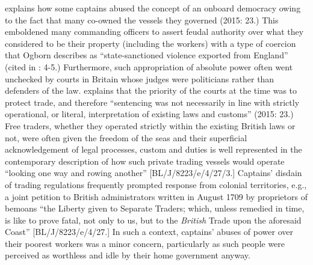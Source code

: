 \citeauthor{Fusaro2015} explains how some captains abused the concept of an onboard democracy owing to the fact that many co-owned the vessels they governed (2015: 23.) This emboldened many commanding officers to assert feudal authority over what they considered to be their property (including the workers) with a type of coercion that Ogborn describes as “state-sanctioned violence exported from England” (cited in \citealt{Fury2015}: 4-5.) Furthermore, such appropriation of absolute power often went unchecked by courts in Britain whose judges were politicians rather than defenders of the law. \citeauthor{Fusaro2015} explains that the priority of the courts at the time was to protect trade, and therefore “sentencing was not necessarily in line with strictly operational, or literal, interpretation of existing laws and customs” (2015: 23.) Free traders, whether they operated strictly within the existing British laws or not, were often given the freedom of the seas and their superficial acknowledgement of legal processes, custom and duties is well represented in the contemporary description of how such private trading vessels would operate “looking one way and rowing another” [BL/J/8223/e/4/27/3.] Captains’ disdain of trading regulations frequently prompted response from colonial territories, e.g., a joint petition to British administrators written in {August 1709} by proprietors of  bemoans “the Liberty given to Separate Traders; which, unless remedied in time, is like to prove fatal, not only to us, but to the \textit{British} Trade upon the aforesaid Coast” [BL/J/8223/e/4/27.] In such a context, captains’ abuses of power over their poorest workers was a minor concern, particularly as such people were perceived as worthless and idle by their home government anyway. 

